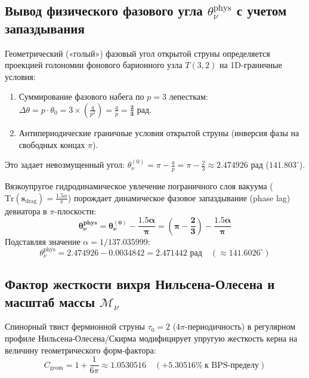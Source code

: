 \documentclass[12pt,a4paper]{article}
\begin{document}
	\subsection{Вывод физического фазового угла $\theta_\nu^{\text{phys}}$ с учетом запаздывания}
	Геометрический («голый») фазовый угол открытой струны определяется проекцией голономии фонового барионного узла $T(3,2)$ на 1D-граничные условия:
	\begin{enumerate}
		\item Суммирование фазового набега по $p=3$ лепесткам: $\Delta \theta = p \cdot \theta_0 = 3 \times \left(\frac{q}{p^2}\right) = \frac{q}{p} = \mathbf{\frac{2}{3} \text{ рад}}$.
		\item Антипериодические граничные условия открытой струны (инверсия фазы на свободных концах $\pi$).
	\end{enumerate}
	Это задает невозмущенный угол: $\theta_\nu^{(0)} = \pi - \frac{q}{p} = \pi - \frac{2}{3} \approx 2.474926$ рад ($141.803^\circ$).
	
	Вязкоупругое гидродинамическое увлечение пограничного слоя вакуума ($\mathrm{Tr}(\mathbf{s}_{\text{drag}}) = \frac{1.5\alpha}{\pi}$) порождает динамическое фазовое запаздывание (phase lag) девиатора в $\pi$-плоскости:
	\begin{equation}
		\mathbf{\theta_\nu^{\text{phys}} = \theta_\nu^{(0)} - \frac{1.5\alpha}{\pi} = \left(\pi - \frac{2}{3}\right) - \frac{1.5\alpha}{\pi}}
	\end{equation}
	Подставляя значение $\alpha = 1/137.035999$:
	\begin{equation}
		\theta_\nu^{\text{phys}} = 2.474926 - 0.0034842 = \mathbf{2.471442 \text{ рад}} \quad (\approx 141.6026^\circ)
	\end{equation}
	
	\subsection{Фактор жесткости вихря Нильсена-Олесена и масштаб массы $\mathcal{M}_\nu$}
	Спинорный твист фермионной струны $\tau_0 = 2$ ($4\pi$-периодичность) в регулярном профиле Нильсена-Олесена/Скирма модифицирует упругую жесткость керна на величину геометрического форм-фактора:
	\begin{equation}
		C_{\text{geom}} = 1 + \frac{1}{6\pi} \approx 1.0530516 \quad (\mathbf{+5.30516\%} \ \text{к BPS-пределу})
	\end{equation}
	
\end{document}
